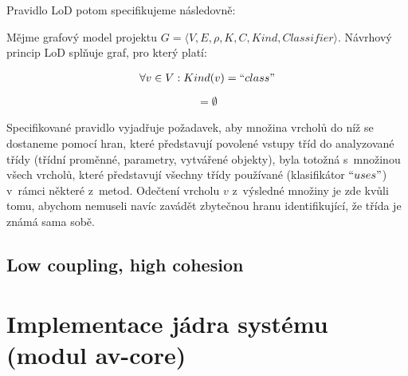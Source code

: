 Pravidlo LoD potom specifikujeme následovně:

\begin{designprinciple}
Mějme grafový model projektu $G = \langle V, E, \rho, K, C, \mathit{Kind}, \mathit{Classifier}\rangle$. Návrhový princip LoD splňuje graf, pro který platí:

\begin{align*}
\forall v \in V: Kind(v) = ``class"\\
\end{align*}
\begin{align*}
[((&F(G, v, ``class", ``has\_field") \cup F(G, v, ``class", ``has\_param") \cup \\
&F(G, v, ``class", ``instantiates")) \cap F(v, ``class", ``uses") \setminus \{v\}] = \emptyset
\end{align*}

\end{designprinciple}

Specifikované pravidlo vyjadřuje požadavek, aby množina vrcholů do níž se dostaneme pomocí hran, které představují povolené vstupy tříd do analyzované třídy (třídní proměnné, parametry, vytvářené objekty), byla totožná s~množinou všech vrcholů, které představují všechny třídy používané (klasifikátor $``uses"$) v~rámci některé z~metod. Odečtení vrcholu $v$ z~výsledné množiny je zde kvůli tomu, abychom nemuseli navíc zavádět zbytečnou hranu identifikující, že třída je známá sama sobě.

\subsection{Low coupling, high cohesion}

\section{Implementace jádra systému (modul av-core)}

